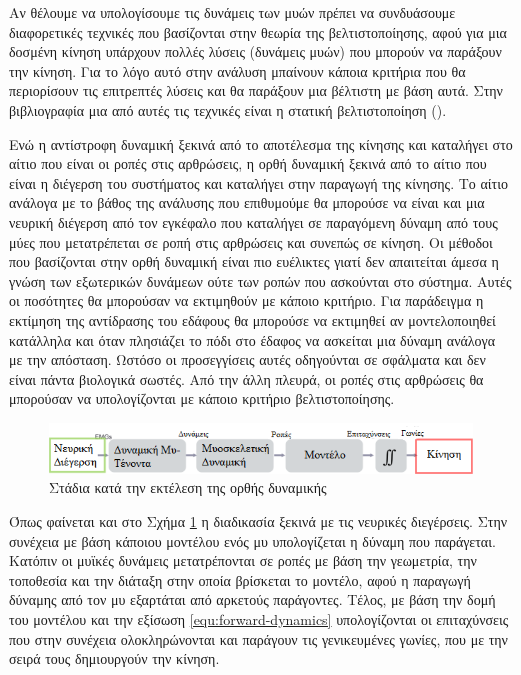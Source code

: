 Αν θέλουμε να υπολογίσουμε τις δυνάμεις των μυών πρέπει να συνδυάσουμε διαφορετικές τεχνικές που βασίζονται στην θεωρία της βελτιστοποίησης, αφού για μια δοσμένη κίνηση υπάρχουν πολλές λύσεις (δυνάμεις μυών) που μπορούν να παράξουν την κίνηση. Για το λόγο αυτό στην ανάλυση μπαίνουν κάποια κριτήρια που θα περιορίσουν τις επιτρεπτές λύσεις και θα παράξουν μια βέλτιστη με βάση αυτά. Στην βιβλιογραφία μια από αυτές τις τεχνικές είναι η στατική βελτιστοποίηση ().

Ενώ η αντίστροφη δυναμική ξεκινά από το αποτέλεσμα της κίνησης και καταλήγει στο αίτιο που είναι οι ροπές στις αρθρώσεις, η ορθή δυναμική ξεκινά από το αίτιο που είναι η διέγερση του συστήματος και καταλήγει στην παραγωγή της κίνησης. Το αίτιο ανάλογα με το βάθος της ανάλυσης που επιθυμούμε θα μπορούσε να είναι και μια νευρική διέγερση από τον εγκέφαλο που καταλήγει σε παραγόμενη δύναμη από τους μύες που μετατρέπεται σε ροπή στις αρθρώσεις και συνεπώς σε κίνηση. Οι μέθοδοι που βασίζονται στην ορθή δυναμική είναι πιο ευέλικτες γιατί δεν απαιτείται άμεσα η γνώση των εξωτερικών δυνάμεων ούτε των ροπών που ασκούνται στο σύστημα. Αυτές οι ποσότητες θα μπορούσαν να εκτιμηθούν με κάποιο κριτήριο. Για παράδειγμα η εκτίμηση της αντίδρασης του εδάφους θα μπορούσε να εκτιμηθεί αν μοντελοποιηθεί κατάλληλα και όταν πλησιάζει το πόδι στο έδαφος να ασκείται μια δύναμη ανάλογα με την απόσταση. Ωστόσο οι προσεγγίσεις αυτές οδηγούνται σε σφάλματα και δεν είναι πάντα βιολογικά σωστές. Από την άλλη πλευρά, οι ροπές στις αρθρώσεις θα μπορούσαν να υπολογίζονται με κάποιο κριτήριο βελτιστοποίησης.

\begin{figure}[H]
    \centering
    \includegraphics[width=1.0\textwidth, keepaspectratio]{fig/forward-simulation.png}
    \caption{Στάδια κατά την εκτέλεση της ορθής δυναμικής\protect\footnotemark}
    \label{fig:forward-simulation}
\end{figure}

Όπως φαίνεται και στο Σχήμα \ref{fig:forward-simulation} η διαδικασία ξεκινά με τις νευρικές διεγέρσεις. Στην συνέχεια με βάση κάποιου μοντέλου ενός μυ υπολογίζεται η δύναμη που παράγεται. Κατόπιν οι μυϊκές δυνάμεις μετατρέπονται σε ροπές με βάση την γεωμετρία, την τοποθεσία και την διάταξη στην οποία βρίσκεται το μοντέλο, αφού η παραγωγή δύναμης από τον μυ εξαρτάται από αρκετούς παράγοντες. Τέλος, με βάση την δομή του μοντέλου και την εξίσωση \ref{equ:forward-dynamics} υπολογίζονται οι επιταχύνσεις που στην συνέχεια ολοκληρώνονται και παράγουν τις γενικευμένες γωνίες, που με την σειρά τους δημιουργούν την κίνηση.


